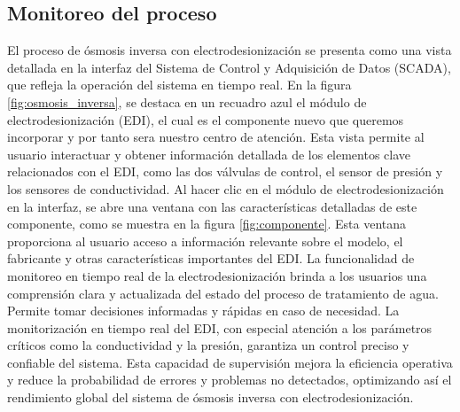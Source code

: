 \subsection{Monitoreo del proceso}

El proceso de ósmosis inversa con electrodesionización se presenta como una vista detallada en la
interfaz del Sistema de Control y Adquisición de Datos (SCADA), que refleja la operación del sistema en
tiempo real. En la figura \ref{fig:osmosis_inversa}, se destaca en un recuadro azul el módulo de electrodesionización (EDI),
el cual es el componente nuevo que queremos incorporar y por tanto sera nuestro centro de atención. Esta vista permite al usuario interactuar
y obtener información detallada de los elementos clave relacionados con el EDI, como las dos válvulas de control, el
sensor de presión y los sensores de conductividad.
Al hacer clic en el módulo de electrodesionización en la interfaz, se abre una ventana con las características
detalladas de este componente, como se muestra en la figura \ref{fig:componente}. Esta ventana proporciona al usuario acceso a
información relevante sobre el modelo, el fabricante y otras características importantes del EDI.
La funcionalidad de monitoreo en tiempo real de la electrodesionización brinda a los usuarios una comprensión
clara y actualizada del estado del proceso de tratamiento de agua. Permite tomar decisiones informadas y
rápidas en caso de necesidad. La monitorización en tiempo real del EDI, con especial atención a los parámetros
críticos como la conductividad y la presión, garantiza un control preciso y confiable del sistema. Esta capacidad
de supervisión mejora la eficiencia operativa y reduce la probabilidad de errores y problemas no detectados,
optimizando así el rendimiento global del sistema de ósmosis inversa con electrodesionización.

